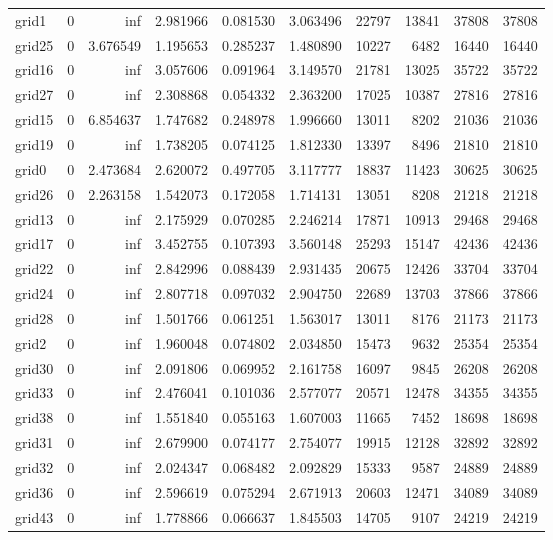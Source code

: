 \begin{longtable}{|l|r|r|r|r|r|r|r|r|r|}
grid1 & 0 & inf & 2.981966 & 0.081530 & 3.063496 & 22797 & 13841 & 37808 & 37808 \\
grid25 & 0 & 3.676549 & 1.195653 & 0.285237 & 1.480890 & 10227 & 6482 & 16440 & 16440 \\
grid16 & 0 & inf & 3.057606 & 0.091964 & 3.149570 & 21781 & 13025 & 35722 & 35722 \\
grid27 & 0 & inf & 2.308868 & 0.054332 & 2.363200 & 17025 & 10387 & 27816 & 27816 \\
grid15 & 0 & 6.854637 & 1.747682 & 0.248978 & 1.996660 & 13011 & 8202 & 21036 & 21036 \\
grid19 & 0 & inf & 1.738205 & 0.074125 & 1.812330 & 13397 & 8496 & 21810 & 21810 \\
grid0 & 0 & 2.473684 & 2.620072 & 0.497705 & 3.117777 & 18837 & 11423 & 30625 & 30625 \\
grid26 & 0 & 2.263158 & 1.542073 & 0.172058 & 1.714131 & 13051 & 8208 & 21218 & 21218 \\
grid13 & 0 & inf & 2.175929 & 0.070285 & 2.246214 & 17871 & 10913 & 29468 & 29468 \\
grid17 & 0 & inf & 3.452755 & 0.107393 & 3.560148 & 25293 & 15147 & 42436 & 42436 \\
grid22 & 0 & inf & 2.842996 & 0.088439 & 2.931435 & 20675 & 12426 & 33704 & 33704 \\
grid24 & 0 & inf & 2.807718 & 0.097032 & 2.904750 & 22689 & 13703 & 37866 & 37866 \\
grid28 & 0 & inf & 1.501766 & 0.061251 & 1.563017 & 13011 & 8176 & 21173 & 21173 \\
grid2 & 0 & inf & 1.960048 & 0.074802 & 2.034850 & 15473 & 9632 & 25354 & 25354 \\
grid30 & 0 & inf & 2.091806 & 0.069952 & 2.161758 & 16097 & 9845 & 26208 & 26208 \\
grid33 & 0 & inf & 2.476041 & 0.101036 & 2.577077 & 20571 & 12478 & 34355 & 34355 \\
grid38 & 0 & inf & 1.551840 & 0.055163 & 1.607003 & 11665 & 7452 & 18698 & 18698 \\
grid31 & 0 & inf & 2.679900 & 0.074177 & 2.754077 & 19915 & 12128 & 32892 & 32892 \\
grid32 & 0 & inf & 2.024347 & 0.068482 & 2.092829 & 15333 & 9587 & 24889 & 24889 \\
grid36 & 0 & inf & 2.596619 & 0.075294 & 2.671913 & 20603 & 12471 & 34089 & 34089 \\
grid43 & 0 & inf & 1.778866 & 0.066637 & 1.845503 & 14705 & 9107 & 24219 & 24219 \\

\end{longtable}
